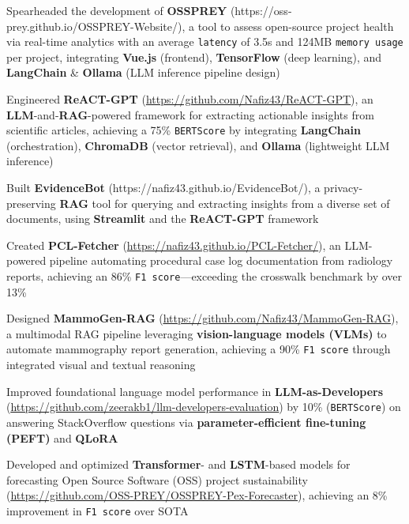 \documentclass[10pt, letterpaper]{article}
\newcommand{\resumeItem}[1]{
  \item\small{
    {#1 \vspace{-2pt}}
  }
}
\begin{document}
    \resumeItem{Spearheaded the development of \textbf{OSSPREY} (https://oss-prey.github.io/OSSPREY-Website/), a tool to assess open-source project health via real-time analytics with an average \texttt{latency} of 3.5s and 124MB \texttt{memory usage} per project, integrating \textbf{Vue.js} (frontend), \textbf{TensorFlow} (deep learning), and \textbf{LangChain} \& \textbf{Ollama} (LLM inference pipeline design)}


    \resumeItem{Engineered \textbf{ReACT-GPT} (\href{https://github.com/Nafiz43/ReACT-GPT}{\underline{https://github.com/Nafiz43/ReACT-GPT}}), an \textbf{LLM}-and-\textbf{RAG}-powered framework for extracting actionable insights from scientific articles, achieving a 75\% \texttt{BERTScore} by integrating \textbf{LangChain} (orchestration), \textbf{ChromaDB} (vector retrieval), and \textbf{Ollama} (lightweight LLM inference)}

    \resumeItem{Built \textbf{EvidenceBot} (https://nafiz43.github.io/EvidenceBot/), a privacy-preserving \textbf{RAG} tool for querying and extracting insights from a diverse set of documents, using \textbf{Streamlit} and the \textbf{ReACT-GPT} framework}



    \resumeItem{Created \textbf{PCL-Fetcher} (\href{https://nafiz43.github.io/PCL-Fetcher/}{\underline{https://nafiz43.github.io/PCL-Fetcher/}}), an LLM-powered pipeline automating procedural case log documentation from radiology reports, achieving an 86\% \texttt{F1 score}—exceeding the crosswalk benchmark by over 13\%}

    \resumeItem{Designed \textbf{MammoGen-RAG} (\href{https://github.com/Nafiz43/MammoGen-RAG}{\underline{https://github.com/Nafiz43/MammoGen-RAG}}), a multimodal RAG pipeline leveraging \textbf{vision-language models (VLMs)} to automate mammography report generation, achieving a 90\% \texttt{F1 score} through integrated visual and textual reasoning}



    \resumeItem{Improved foundational language model performance in \textbf{LLM-as-Developers} (\href{https://github.com/zeerakb1/llm-developers-evaluation}{\underline{https://github.com/zeerakb1/llm-developers-evaluation}}) by 10\% (\texttt{BERTScore}) on answering StackOverflow questions via \textbf{parameter-efficient fine-tuning (PEFT)} and \textbf{QLoRA}}

    \resumeItem{Developed and optimized \textbf{Transformer}- and \textbf{LSTM}-based models for forecasting Open Source Software (OSS) project sustainability (\href{https://github.com/OSS-PREY/OSSPREY-Pex-Forecaster}{\underline{https://github.com/OSS-PREY/OSSPREY-Pex-Forecaster}}), achieving an 8\% improvement in \texttt{F1 score} over SOTA}
\end{document}
